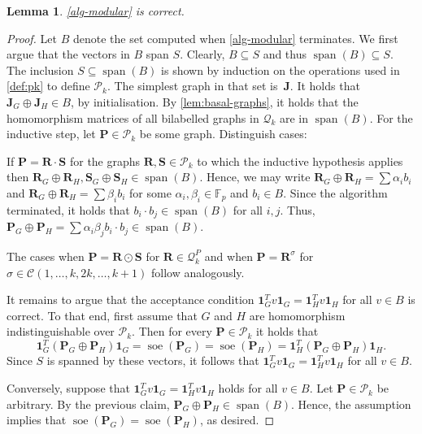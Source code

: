 \documentclass[a4paper,onecolumn,11pt,accepted=2026-01-06]{quantumarticle}
\theoremstyle{plain}
\newtheorem{lem}[thm]{Lemma}
\theoremstyle{remark}
\theoremstyle{definition}
\DeclareMathOperator{\soe}{soe}
\DeclareMathOperator{\spn}{span}
\newcommand{\cyclicpermutations}{\mathscr{C}(1,\dots, k, 2k, \dots, k+1)}
\begin{document}
\begin{lem}
    \cref{alg-modular} is correct.
\end{lem}
\begin{proof}
    Let $B$ denote the set computed when \cref{alg-modular} terminates.
    We first argue that the vectors in $B$ span $S$.
    Clearly, $B \subseteq S$ and thus $\spn(B)\subseteq S$.
    The inclusion $S \subseteq \spn(B)$ 
    is shown by induction on the operations used in \cref{def:pk} to define $\mathcal{P}_k$.
    The simplest graph in that set is~$\boldsymbol{J}$.
    It holds that $\boldsymbol{J}_G \oplus \boldsymbol{J}_H \in B$, by initialisation.
    By \cref{lem:basal-graphs}, it holds that the homomorphism matrices of all bilabelled graphs in $\mathcal{Q}_k$ are in $\spn(B)$.
    For the inductive step, let $\boldsymbol{P} \in \mathcal{P}_k$ be some graph. Distinguish cases:

    If $\boldsymbol{P} = \boldsymbol{R} \cdot \boldsymbol{S}$ for the graphs $\boldsymbol{R}, \boldsymbol{S} \in \mathcal{P}_k$ 
    to which the inductive hypothesis applies then $\boldsymbol{R}_G \oplus \boldsymbol{R}_H, \boldsymbol{S}_G \oplus \boldsymbol{S}_H \in \spn(B)$.
    Hence, we may write $\boldsymbol{R}_G \oplus \boldsymbol{R}_H = \sum \alpha_i b_i$ and  $\boldsymbol{R}_G \oplus \boldsymbol{R}_H = \sum \beta_i b_i$ for some $\alpha_i, \beta_i \in \mathbb{F}_p$ and $b_i \in B$.
    Since the algorithm terminated, it holds that $b_i \cdot b_j \in \spn(B)$ for all $i,j$. 
    Thus, $\boldsymbol{P}_G \oplus \boldsymbol{P}_H = \sum \alpha_i \beta_j b_i \cdot b_j \in \spn(B)$.

    The cases when $\boldsymbol{P} = \boldsymbol{R} \odot \boldsymbol{S}$ for $\boldsymbol{R} \in \mathcal{Q}_k^P$ and when $\boldsymbol{P} = \boldsymbol{R}^\sigma$ for $\sigma \in \cyclicpermutations$ follow analogously.

    It remains to argue that the acceptance condition $\boldsymbol{1}_G^T v \boldsymbol{1}_G = \boldsymbol{1}_H^Tv \boldsymbol{1}_H$ for all $v \in B$  is correct.
    To that end, first assume that $G$ and $H$ are homomorphism indistinguishable over $\mathcal{P}_k$.
    Then for every $\boldsymbol{P} \in \mathcal{P}_k$ it holds that
    \[
         \boldsymbol{1}_G^T (\boldsymbol{P}_G \oplus \boldsymbol{P}_H) \boldsymbol{1}_G   
        = \soe(\boldsymbol{P}_G) 
        = \soe(\boldsymbol{P}_H)
        = \boldsymbol{1}_H^T (\boldsymbol{P}_G \oplus \boldsymbol{P}_H) \boldsymbol{1}_H.  
    \]
    Since $S$ is spanned by these vectors, it follows that $\boldsymbol{1}_G^T v \boldsymbol{1}_G = \boldsymbol{1}_H^Tv \boldsymbol{1}_H$ for all $v \in B$.

    Conversely, suppose that $\boldsymbol{1}_G^T v \boldsymbol{1}_G = \boldsymbol{1}_H^Tv \boldsymbol{1}_H$  holds for all $v \in B$.
    Let $\boldsymbol{P} \in \mathcal{P}_k$ be arbitrary.
    By the previous claim, $\boldsymbol{P}_G \oplus \boldsymbol{P}_H \in \spn(B)$.
    Hence, the assumption implies that $\soe(\boldsymbol{P}_G) = \soe(\boldsymbol{P}_H)$, as desired.
\end{proof}
\end{document}
